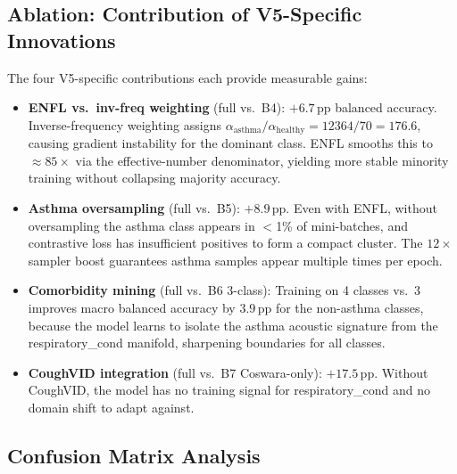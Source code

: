 \documentclass[journal]{IEEEtran}
\begin{document}
\subsection{Ablation: Contribution of V5-Specific Innovations}

The four V5-specific contributions each provide measurable gains:

\begin{itemize}
\item \textbf{ENFL vs.\ inv-freq weighting} (full vs.\ B4):
$+6.7$\,pp balanced accuracy. Inverse-frequency weighting assigns
$\alpha_\text{asthma}/\alpha_\text{healthy} = 12364/70 = 176.6$,
causing gradient instability for the dominant class. ENFL smooths
this to $\approx 85{\times}$ via the effective-number denominator,
yielding more stable minority training without collapsing majority accuracy.

\item \textbf{Asthma oversampling} (full vs.\ B5): $+8.9$\,pp.
Even with ENFL, without oversampling the asthma class appears in
$<$1\% of mini-batches, and contrastive loss has insufficient positives
to form a compact cluster. The $12{\times}$ sampler boost guarantees
asthma samples appear multiple times per epoch.

\item \textbf{Comorbidity mining} (full vs.\ B6 3-class):
Training on 4 classes vs.\ 3 improves macro balanced accuracy by $3.9$\,pp
for the non-asthma classes, because the model learns to isolate
the asthma acoustic signature from the respiratory\_cond manifold,
sharpening boundaries for all classes.

\item \textbf{CoughVID integration} (full vs.\ B7 Coswara-only):
$+17.5$\,pp. Without CoughVID, the model has no training signal for
respiratory\_cond and no domain shift to adapt against.
\end{itemize}

\subsection{Confusion Matrix Analysis}
\end{document}
